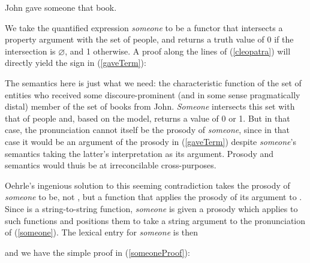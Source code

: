\documentclass[output=paper,colorlinks,citecolor=brown]{langscibook}
\begin{document}
\begin{exe}
 \ex\label{someone}
  John gave someone that book.
\end{exe}
We take the quantified expression \textit{someone} to be a functor that
intersects a property argument with the set of people, and returns a
truth value of 0 if the intersection is $\varnothing$, and 1
otherwise. A proof along the lines of (\ref{cleopatra}) will directly yield the
sign in (\ref{gaveTerm}):

\begin{exe}
 \ex\label{gaveTerm}
\end{exe}
The semantics here is just what we need: the characteristic function
of the set of entities who received some discoure-prominent (and in
some sense pragmatically distal) member of the set of books from
John. \textit{Someone} intersects this set with that of people and, based on
the model, returns a value of 0 or 1. But in that case, the pronunciation
 cannot itself be the prosody of \textit{someone}, since in that
case it would be an argument of the prosody in (\ref{gaveTerm}) despite
\textit{someone}'s semantics taking the latter's
interpretation as its argument. Prosody and semantics would thuis be at
irreconcilable cross-purposes.

Oehrle's ingenious solution to this seeming contradiction takes the
prosody of \textit{someone} to be, not , but a function that
applies the prosody of its  argument to . Since
 is a string-to-string
function, \textit{someone} is given a prosody which applies to such functions
and positions them to take a string argument  to the
pronunciation of (\ref{someone}). The lexical entry for \textit{someone} is then

\begin{exe}
 \ex\label{someoneEntry}
\end{exe}
and we have the simple proof in (\ref{someoneProof}):
\end{document}
